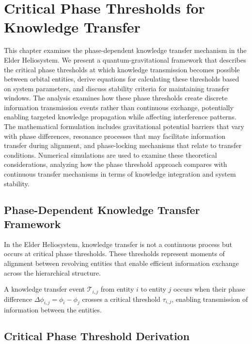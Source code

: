 \chapter{Critical Phase Thresholds for Knowledge Transfer}

\begin{tcolorbox}[colback=PureBlue!5!white,colframe=PureBlue!75!black,title=Chapter Summary]
This chapter examines the phase-dependent knowledge transfer mechanism in the Elder Heliosystem. We present a quantum-gravitational framework that describes the critical phase thresholds at which knowledge transmission becomes possible between orbital entities, derive equations for calculating these thresholds based on system parameters, and discuss stability criteria for maintaining transfer windows. The analysis examines how these phase thresholds create discrete information transmission events rather than continuous exchange, potentially enabling targeted knowledge propagation while affecting interference patterns. The mathematical formulation includes gravitational potential barriers that vary with phase differences, resonance processes that may facilitate information transfer during alignment, and phase-locking mechanisms that relate to transfer conditions. Numerical simulations are used to examine these theoretical considerations, analyzing how the phase threshold approach compares with continuous transfer mechanisms in terms of knowledge integration and system stability.
\end{tcolorbox}

\section{Phase-Dependent Knowledge Transfer Framework}

In the Elder Heliosystem, knowledge transfer is not a continuous process but occurs at critical phase thresholds. These thresholds represent moments of alignment between revolving entities that enable efficient information exchange across the hierarchical structure.

\begin{definition}
A knowledge transfer event $\mathcal{T}_{i,j}$ from entity $i$ to entity $j$ occurs when their phase difference $\Delta\phi_{i,j} = \phi_i - \phi_j$ crosses a critical threshold $\tau_{i,j}$, enabling transmission of information between the entities.
\end{definition}

\section{Critical Phase Threshold Derivation}

